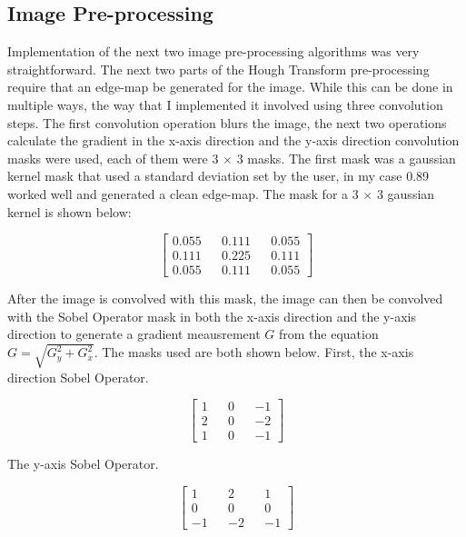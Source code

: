\documentclass[conference]{IEEEtran}
\begin{document}
\subsection{Image Pre-processing}
Implementation of the next two image pre-processing algorithms was very straightforward. 
The next two parts of the Hough Transform pre-processing require that an edge-map be generated for the image. 
While this can be done in multiple ways, the way that I implemented it involved using three convolution steps. 
The first convolution operation blurs the image, the next two operations calculate the gradient in the x-axis direction and the y-axis direction convolution masks were used, each of them were 3 $\times$ 3 masks. 
The first mask was a gaussian kernel mask that used a standard deviation set by the user, in my case 0.89 worked well and generated a clean edge-map. The mask for a 3 $\times$ 3 gaussian kernel is shown below:

\begin{equation}
  \begin{bmatrix}
    0.055 && 0.111 && 0.055 \\
    0.111 && 0.225 && 0.111 \\
    0.055 && 0.111 && 0.055
  \end{bmatrix}
  \label{eq:gaussianKernel}
\end{equation}

After the image is convolved with this mask, the image can then be convolved with the Sobel Operator mask in both the x-axis direction and the y-axis direction to generate a gradient meausrement $G$ from the equation $G = \sqrt{G_y^2 + G_x^2}$. 
The masks used are both shown below. 
First, the x-axis direction Sobel Operator.

\begin{equation}
  \begin{bmatrix}
    1 && 0 && -1 \\
    2 && 0 && -2 \\
    1 && 0 && -1
  \end{bmatrix}
  \label{eq:xSobelOperator}
\end{equation}

The y-axis Sobel Operator. 

\begin{equation}
  \begin{bmatrix}
    1 && 2 && 1 \\
    0 && 0 && 0 \\
    -1 && -2 && -1
  \end{bmatrix}
  \label{eq:ySobelOperator}
\end{equation}
\end{document}
